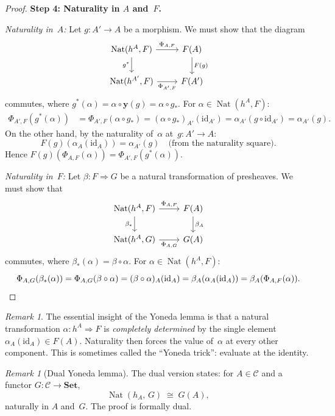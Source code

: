 \documentclass[a4paper,12pt]{book}
\DeclareMathOperator{\Nat}{Nat}
\newcommand{\Set}{\mathbf{Set}}
\newcommand{\id}{\mathrm{id}}
\theoremstyle{definition}
\theoremstyle{plain}
\theoremstyle{remark}
\newtheorem{remark}[definition]{Remark}
\begin{document}
\begin{proof}
\medskip\noindent
\textbf{Step 4: Naturality in $A$ and~$F$.}

\emph{Naturality in~$A$:}
Let $g\colon A'\to A$ be a morphism.  We must show that the diagram
\[
\begin{tikzcd}
\Nat(h^A,F) \arrow[r, "\Phi_{A,F}"] \arrow[d, "g^*"'] &
F(A) \arrow[d, "F(g)"] \\
\Nat(h^{A'},F) \arrow[r, "\Phi_{A',F}"'] &
F(A')
\end{tikzcd}
\]
commutes, where $g^*(\alpha) = \alpha\circ\mathbf{y}(g) = \alpha\circ g_*$.
For $\alpha\in\Nat(h^A,F)$:
\begin{align*}
    \Phi_{A',F}(g^*(\alpha))
    &= \Phi_{A',F}(\alpha\circ g_*)
    = (\alpha\circ g_*)_{A'}(\id_{A'})
    = \alpha_{A'}(g\circ\id_{A'})
    = \alpha_{A'}(g).
\end{align*}
On the other hand, by the naturality of~$\alpha$ at~$g\colon A'\to A$:
\[
    F(g)(\alpha_A(\id_A)) = \alpha_{A'}(g) \quad\text{(from the naturality square)}.
\]
Hence $F(g)(\Phi_{A,F}(\alpha)) = \Phi_{A',F}(g^*(\alpha))$.

\emph{Naturality in~$F$:}
Let $\beta\colon F\Rightarrow G$ be a natural transformation of presheaves.
We must show that
\[
\begin{tikzcd}
\Nat(h^A,F) \arrow[r, "\Phi_{A,F}"] \arrow[d, "\beta_*"'] &
F(A) \arrow[d, "\beta_A"] \\
\Nat(h^A,G) \arrow[r, "\Phi_{A,G}"'] &
G(A)
\end{tikzcd}
\]
commutes, where $\beta_*(\alpha) = \beta\circ\alpha$.
For $\alpha\in\Nat(h^A,F)$:
\[
    \Phi_{A,G}(\beta_*(\alpha)) = \Phi_{A,G}(\beta\circ\alpha)
    = (\beta\circ\alpha)_A(\id_A) = \beta_A(\alpha_A(\id_A))
    = \beta_A(\Phi_{A,F}(\alpha)). \qedhere
\]
\end{proof}

\begin{remark}\label{rem:yoneda-key-idea}
The essential insight of the Yoneda lemma is that a natural transformation
$\alpha\colon h^A\Rightarrow F$ is \emph{completely determined} by the
single element $\alpha_A(\id_A)\in F(A)$.  Naturality then forces
the value of~$\alpha$ at every other component.  This is sometimes
called the ``Yoneda trick'': evaluate at the identity.
\end{remark}

\begin{remark}[Dual Yoneda lemma]\label{rem:yoneda-dual}
The dual version states: for $A\in\mathcal{C}$ and a functor
$G\colon\mathcal{C}\to\Set$,
\[
    \Nat(h_A,\,G) \;\cong\; G(A),
\]
naturally in $A$ and~$G$.  The proof is formally dual.
\end{remark}
\end{document}
